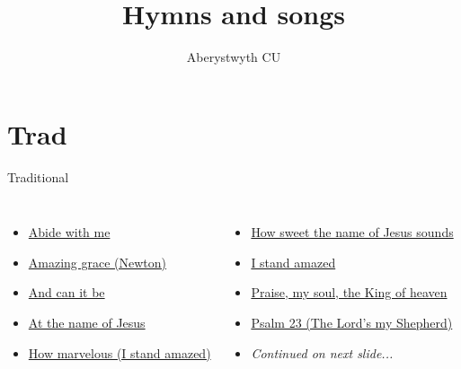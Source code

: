 \documentclass{beamer}
\title{Hymns and songs}
\author{Aberystwyth CU}
\date{}
\begin{document}
\maketitle
\section{Trad}

\begin{frame}[t]{Traditional}
\begin{columns}[t]
        \begin{itemize}
    \item \hyperlink{Abide with me[]}{Abide with me } \phantom{ 1 1 1 1 1 1 1 1 1 1 1}
    \item \hyperlink{Amazing grace[](Newton)}{Amazing grace (Newton)} \phantom{ 1 1 1 1 1 1 1}
            \item \hyperlink{And can it be[]}{And can it be } \phantom{ 1 1 1 1 1 1 1 1 1 1 1}
                    \item \hyperlink{At the name of Jesus[]}{At the name of Jesus } \phantom{ 1 1 1 1 1 1 1}
            \item \hyperlink{I stand amazed['How marvelous']}{How marvelous (I stand amazed)} \phantom{ 1 1 1}
\end{itemize}
        \begin{itemize}
                    \item \hyperlink{How sweet the name of Jesus sounds[]}{How sweet the name of Jesus sounds } \phantom{}
                    \item \hyperlink{I stand amazed['How marvelous']}{I stand amazed } \phantom{ 1 1 1 1 1 1 1 1 1 1}
            \item \hyperlink{Praise, my soul, the King of heaven[]}{Praise, my soul, the King of heaven } \phantom{}
    \item \hyperlink{The Lord's my Shepherd['Psalm 23'](Trad)}{Psalm 23 (The Lord's my Shepherd)} \phantom{ 1}
    \item[] \textit{Continued on next slide...}
            \end{itemize}
            \end{columns}
            \end{frame}
\end{document}
